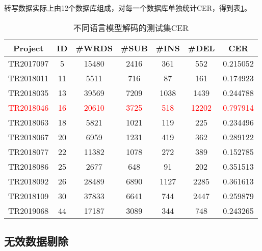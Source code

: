 转写数据实际上由12个数据库组成，对每一个数据库单独统计CER，得到表\ref{tab:cer-per}。
\begin{table}[h]
 \centering
 \caption{不同语言模型解码的测试集CER}
	 \begin{tabular*}{1\textwidth}{@{\extracolsep{\fill}}ccccccc}
	 \toprule
		{\bf Project   } & {\bf ID   } & {\bf #WRDS   } & {\bf #SUB    } & {\bf #INS    } & {\bf #DEL    } & {\bf CER  } \\
	 \midrule
		TR2017097  &          5 &      15480 &       2416 &        361 &        552 &   0.215052 \\
		TR2018011  &         11 &       5511 &        716 &         87 &        161 &   0.174923 \\
		TR2018035  &         13 &      39569 &       7209 &       1038 &       1439 &   0.244788 \\
		\textcolor{red}{TR2018046}  &         \textcolor{red}{16} &      \textcolor{red}{20610} &       \textcolor{red}{3725} &        \textcolor{red}{518} &      \textcolor{red}{12202} &   \textcolor{red}{0.797914} \\
		TR2018063  &         18 &       5821 &       1021 &        119 &        225 &   0.234496 \\
		TR2018067  &         20 &       6959 &       1231 &        419 &        362 &   0.289122 \\
		TR2018077  &         22 &      11382 &       1078 &        272 &        389 &   0.152785 \\
		TR2018086  &         25 &       2677 &        648 &         91 &        202 &   0.351513 \\
		TR2018092  &         26 &      28489 &       6890 &       1127 &       2285 &   0.361613 \\
		TR2018109  &         30 &      37833 &       6641 &        744 &       2447 &   0.259879 \\
		TR2019068  &         44 &      17187 &       3089 &        344 &        748 &   0.243265 \\
	 \bottomrule
	 \end{tabular*}%
 \label{tab:cer-per}%
\end{table}%



\subsection{无效数据剔除}

